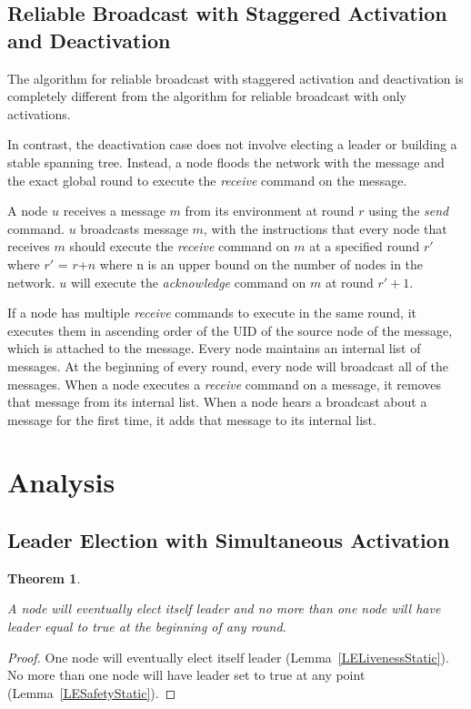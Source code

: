 \documentclass[english]{article}
\newtheorem{theorem}{Theorem}[section]
\begin{document}
  \subsection {Reliable Broadcast with Staggered Activation and Deactivation}

The algorithm for reliable broadcast with staggered activation and deactivation is completely different from the algorithm for reliable broadcast with only activations. 


In contrast, the deactivation case does not involve electing a leader or building a stable spanning tree. Instead, a node floods the network with the message and the exact global round to execute the \textit{receive} command on the message.


A node $u$ receives a message $m$ from its environment at round $r$ using the \textit{send} command. $u$ broadcasts message $m$, with the instructions that every node that receives $m$ should execute the \textit{receive} command on $m$ at a specified round $r'$ where $r'$ = $r$+$n$ where n is an upper bound on the number of nodes in the network. $u$ will execute the \textit{acknowledge} command on $m$ at round $r' + 1$.

If a node has multiple \textit{receive} commands to execute in the same round, it executes them in ascending order of the UID of the source node of the message, which is attached to the message. Every node maintains an internal list of messages. At the beginning of every round, every node will broadcast all of the messages. When a node executes a \textit{receive} command on a message, it removes that message from its internal list.  When a node hears a broadcast about a message for the first time, it adds that message to its internal list.


\section{Analysis}

\subsection{Leader Election with Simultaneous Activation}

\begin{theorem}
\label{LeaderElectionStatic}

A node will eventually elect itself leader and no more than one node will have leader equal to true at the beginning of any round. 
\end{theorem}
\begin{proof}
One node will eventually elect itself leader (Lemma~\ref{LELivenessStatic}).
No more than one node will have leader set to true at any point (Lemma~\ref{LESafetyStatic}).
\end{proof}
\end{document}
